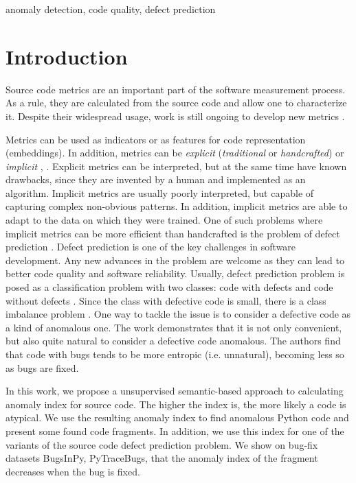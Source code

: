 \documentclass[10pt,conference]{IEEEtran}
\begin{document}
\begin{IEEEkeywords}
anomaly detection, code quality, defect prediction
\end{IEEEkeywords}


\section{Introduction}\label{intro}

Source code metrics are an important part of the software measurement process.
As a rule, they are calculated from the source code and allow one to characterize it.
Despite their widespread usage, work is still ongoing to develop new metrics \cite{SharmaSpinellis2020}.

Metrics can be used as indicators or as features for code representation (embeddings).
In addition, metrics can be {\it explicit} ({\it traditional} or {\it handcrafted}) or {\it implicit} \cite{NunezVarelaEtAl2017}, \cite[Appendix]{AfricEtAl2020}.
Explicit metrics can be interpreted, but at the same time have known drawbacks,
 since they are invented by a human and implemented as an algorithm.
Implicit metrics are usually poorly interpreted, but capable of capturing complex non-obvious patterns.
In addition, implicit metrics are able to adapt to the data on which they were trained.
One of such problems where implicit metrics can be more efficient than handcrafted is the problem of defect prediction \cite{AkimovaEtAl2021}.
Defect prediction is one of the key challenges in software development.
Any new advances in the problem are welcome as they can lead to better code quality and software reliability.
Usually, defect prediction problem is posed as a classification problem with two classes:
 code with defects and code without defects \cite{AllamanisEtAl2018}.
Since the class with defective code is small, there is a class imbalance problem \cite{AlsawalqahEtAl2017}.
One way to tackle the issue is to consider a defective code as a kind of anomalous one.
The work \cite{RayEtAl2016} demonstrates that it is not only convenient, but also quite natural to consider a defective code anomalous.
The authors find that code with bugs tends to be more entropic (i.e. unnatural), becoming less so as bugs are fixed.

In this work, we propose a unsupervised semantic-based approach to calculating anomaly index for source code.
The higher the index is, the more likely a code is atypical.
We use the resulting anomaly index to find anomalous Python code and present some found code fragments.
In addition, we use this index for one of the variants of the source code defect prediction problem.
We show on bug-fix datasets BugsInPy, PyTraceBugs, that the anomaly index of the fragment decreases when the bug is fixed.
\end{document}
